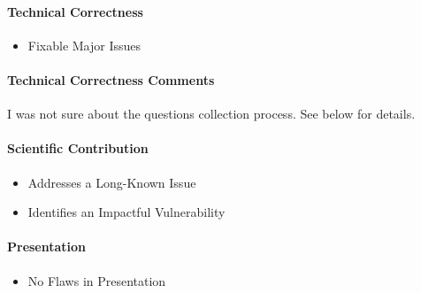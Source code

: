 \documentclass[letterpaper,twocolumn,10pt]{article}
\begin{document}
\paragraph{Technical Correctness}
\begin{itemize}
    \item Fixable Major Issues
\end{itemize}

\paragraph{Technical Correctness Comments}
I was not sure about the questions collection process. See below for details.

\paragraph{Scientific Contribution}
\begin{itemize}
    \item Addresses a Long-Known Issue
    \item Identifies an Impactful Vulnerability
\end{itemize}

\paragraph{Presentation}
\begin{itemize}
    \item No Flaws in Presentation
\end{itemize}
\end{document}
